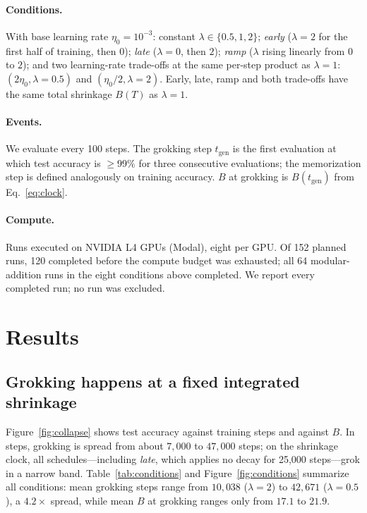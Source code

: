 \documentclass[11pt]{article}
\begin{document}
\paragraph{Conditions.} With base learning rate $\eta_0=10^{-3}$: constant $\lambda\in\{0.5,1,2\}$; \emph{early} ($\lambda=2$ for the first half of training, then $0$); \emph{late} ($\lambda=0$, then $2$); \emph{ramp} ($\lambda$ rising linearly from $0$ to $2$); and two learning-rate trade-offs at the same per-step product as $\lambda=1$: $(2\eta_0,\lambda=0.5)$ and $(\eta_0/2,\lambda=2)$. Early, late, ramp and both trade-offs have the same total shrinkage $B(T)$ as $\lambda=1$.

\paragraph{Events.} We evaluate every 100 steps. The grokking step $t_\text{gen}$ is the first evaluation at which test accuracy is $\geq 99\%$ for three consecutive evaluations; the memorization step is defined analogously on training accuracy. $B$ at grokking is $B(t_\text{gen})$ from Eq.~\ref{eq:clock}.

\paragraph{Compute.} Runs executed on NVIDIA L4 GPUs (Modal), eight per GPU. Of 152 planned runs, 120 completed before the compute budget was exhausted; all 64 modular-addition runs in the eight conditions above completed. We report every completed run; no run was excluded.

\section{Results}
\subsection{Grokking happens at a fixed integrated shrinkage}\label{sec:clock}
Figure~\ref{fig:collapse} shows test accuracy against training steps and against $B$. In steps, grokking is spread from about $7{,}000$ to $47{,}000$ steps; on the shrinkage clock, all schedules---including \emph{late}, which applies no decay for 25{,}000 steps---grok in a narrow band. Table~\ref{tab:conditions} and Figure~\ref{fig:conditions} summarize all conditions: mean grokking steps range from $10{,}038$ ($\lambda=2$) to $42{,}671$ ($\lambda=0.5$), a $4.2\times$ spread, while mean $B$ at grokking ranges only from $17.1$ to $21.9$.
\end{document}
